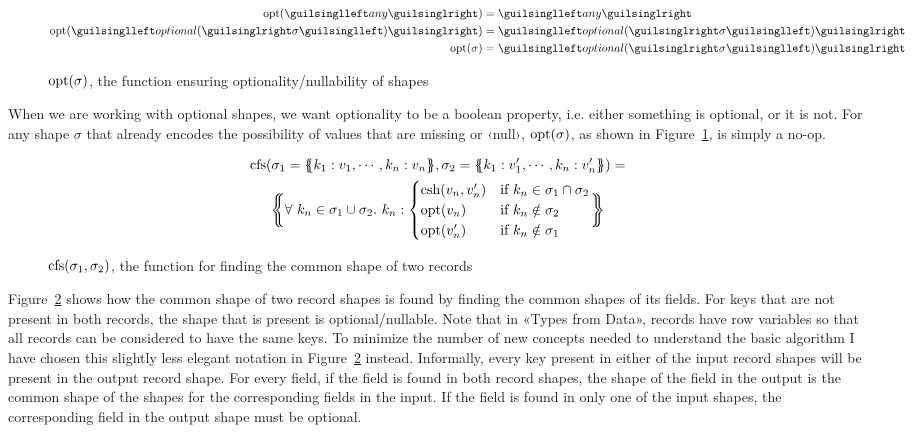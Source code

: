 \begin{figure}[ht!]
\begin{align*}
\opt(‹any›)                &= ‹any› \\
\opt(‹optional(›\sigma‹)›) &= ‹optional(›\sigma‹)› \\
\opt(\sigma)               &= ‹optional(›\sigma‹)›
\end{align*}
\caption{$\operatorname{opt}(\sigma)$, the function ensuring optionality/nullability of shapes}
\label{fig:opt}
\end{figure}

When we are working with optional shapes, we want optionality to be a boolean property, i.e. either something is optional, or it is not. For any shape $\sigma$ that already encodes the possibility of values that are missing or ‹null›, $\operatorname{opt}(\sigma)$, as shown in Figure~\ref{fig:opt}, is simply a no-op.

\begin{figure}[ht!]
\begin{gather*}
\cfs(\sigma_1 = \recd{ k_1 : v_1, \cdots, k_n : v_n }, \sigma_2 = \recd{ k_1 : v'_1, \cdots, k_n : v'_n }) = \\
\recd[\bigg]{
\forall\ k_n \in \sigma_1 \cup \sigma_2 .\ k_n : \begin{cases}
  \csh(v_n, v'_n) & \text{if } k_n \in \sigma_1 \cap \sigma_2 \\
  \opt(v_n) & \text{if } k_n \notin \sigma_2 \\
  \opt(v'_n) & \text{if } k_n \notin \sigma_1
\end{cases}
}
\end{gather*}
\caption{$\operatorname{cfs}(\sigma_1, \sigma_2)$, the function for finding the common shape of two records}
\label{fig:cfs}
\end{figure}

Figure~\ref{fig:cfs} shows how the common shape of two record shapes is found by finding the common shapes of its fields. For keys that are not present in both records, the shape that is present is optional/nullable. Note that in «Types from Data», records have row variables \cite{row-types} so that all records can be considered to have the same keys. To minimize the number of new concepts needed to understand the basic algorithm I have chosen this slightly less elegant notation in Figure~\ref{fig:cfs} instead. Informally, every key present in either of the input record shapes will be present in the output record shape. For every field, if the field is found in both record shapes, the shape of the field in the output is the common shape of the shapes for the corresponding fields in the input. If the field is found in only one of the input shapes, the corresponding field in the output shape must be optional.

